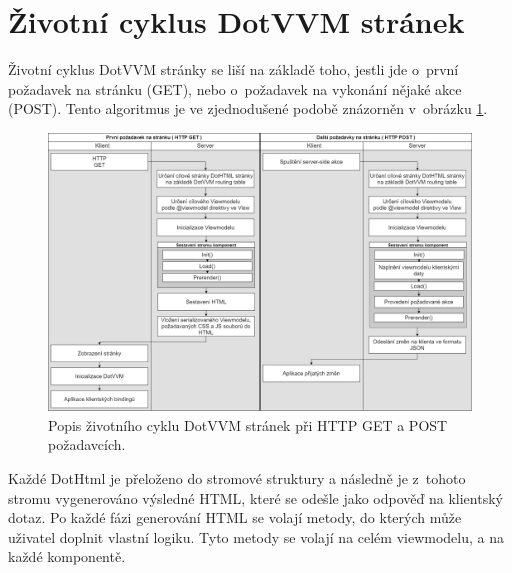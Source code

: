 \section{Životní cyklus DotVVM stránek}
\label{lifecycle}
Životní cyklus DotVVM stránky se liší na základě toho, jestli jde o~první požadavek na stránku (GET), nebo o~požadavek na vykonání nějaké akce (POST)\cite{DotVVM-VM}. Tento algoritmus je ve zjednodušené podobě znázorněn v~obrázku \ref{Get a Post v~DotVVM}.
\begin{figure}[hbt]
	\centering
	\includegraphics[width=1\textwidth]{obrazky-figures/DotVVM_lifecycle.png}\hfill
	\caption{Popis životního cyklu DotVVM stránek při HTTP GET a POST požadavcích.}
	\label{Get a Post v~DotVVM}
\end{figure}

Každé DotHtml je přeloženo do stromové struktury a následně je z~tohoto stromu vygenerováno výsledné HTML, které se odešle jako odpověď na klientský dotaz. Po každé fázi generování HTML se volají metody, do kterých může uživatel doplnit vlastní logiku. Tyto metody se volají na celém viewmodelu, a na každé komponentě.

